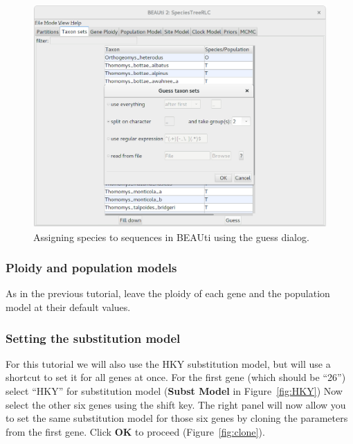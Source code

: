 \documentclass{article}
\begin{document}
\begin{figure}[htb!]
\centering
\includegraphics[width=\textwidth]{figures/beauti-guess.png}
\caption{Assigning species to sequences in BEAUti using the guess dialog.}
\label{fig:taxonSets}
\end{figure}

\vspace{12pt}

\subsubsection*{Ploidy and population models}

As in the previous tutorial, leave the ploidy of each gene and the
population model at their default values.

\clearpage

\subsubsection*{Setting the substitution model}

For this tutorial we will also use the HKY substitution model, but will use a
shortcut to set it for all genes at once. For the first gene (which should be
``26'') select ``HKY'' for substitution model (\textbf{Subst Model} in
Figure~\ref{fig:HKY}) Now select the other six genes using the shift key. The
right panel will now allow you to set the same substitution model for
those six genes by cloning the parameters from the first gene. Click \textbf{OK}
to proceed (Figure~\ref{fig:clone}).
\end{document}
